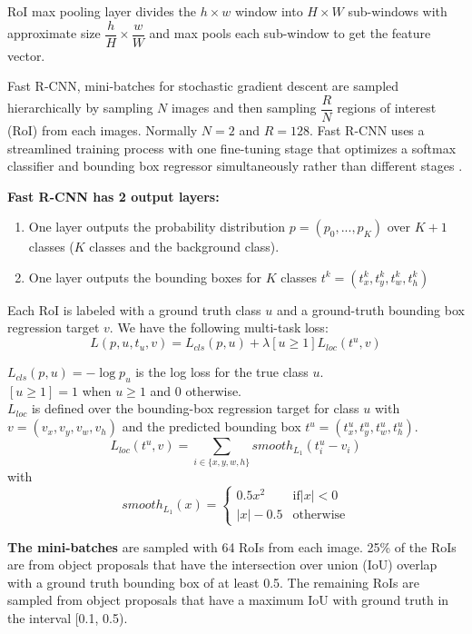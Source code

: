 \documentclass{article}
\begin{document}
RoI max pooling layer divides the $h \times w$ window into $H \times W$ sub-windows with approximate size $\dfrac{h}{H} \times \dfrac{w}{W}$ and max pools each sub-window to get the feature vector. 

Fast R-CNN, mini-batches for stochastic gradient descent are sampled hierarchically by sampling $N$ images and then sampling $\dfrac{R}{N}$ regions of interest (RoI) from each images. Normally $N = 2$ and $R = 128$. Fast R-CNN uses a streamlined training process with one fine-tuning stage that optimizes a softmax classifier and bounding box regressor simultaneously rather than different stages \cite{arxiv/fast-rcnn}.

\noindent \textbf{Fast R-CNN has 2 output layers:}
\begin{enumerate}
	\item  One layer outputs the probability distribution $p = (p_0,...,p_K)$ over $K + 1$ classes ($K$ classes and the background class).
	\item  One layer outputs the bounding boxes for $K$ classes $t^k = (t^k_x, t^k_y, t^k_w, t^k_h)$
\end{enumerate}

Each RoI is labeled with a ground truth class $u$ and a ground-truth bounding box regression target $v$. We have the following multi-task loss:
$$L(p, u, t_u, v) = L_{cls}(p, u) + \lambda [u \ge 1 ] L_{loc}(t^u, v)  $$

$L_{cls}(p, u) = -\log p_u$ is the log loss for the true class $u$. \\
$[u \ge 1] = 1$ when $u \ge 1$ and $0$ otherwise. \\
$L_{loc}$ is defined over the bounding-box regression target for class $u$ with $v = (v_x, v_y, v_w, v_h)$ and the predicted bounding box $t^u = (t^u_x, t^u_y, t^u_w, t^u_h)$.
$$L_{loc}(t^u, v) = \sum_{i \in \{x, y, w, h \}} smooth_{L_1}(t^u_i - v_i) $$
with 
$$smooth_{L_1}(x) = \begin{cases} 
   0.5x^2 & \text{if} |x| < 0 \\
   |x| - 0.5  & \text{otherwise}
  \end{cases}$$

\textbf{The mini-batches} are sampled with 64 RoIs from each image. 25\% of the RoIs are from object proposals that have the intersection over union (IoU) overlap with a ground truth bounding box of at least 0.5. The remaining RoIs are sampled from object proposals that have a maximum IoU with ground truth in the interval [0.1, 0.5).
\end{document}
